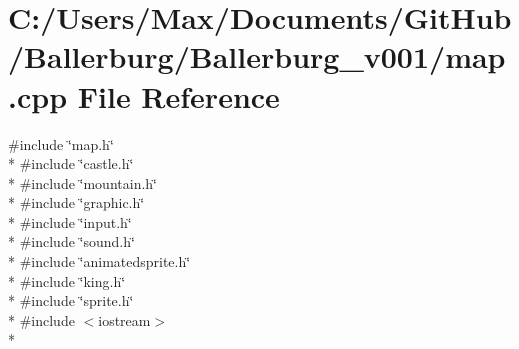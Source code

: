 \section{C\+:/\+Users/\+Max/\+Documents/\+Git\+Hub/\+Ballerburg/\+Ballerburg\+\_\+v001/map.cpp File Reference}
\label{map_8cpp}
{\ttfamily \#include \char`\"{}map.\+h\char`\"{}}\\*
{\ttfamily \#include \char`\"{}castle.\+h\char`\"{}}\\*
{\ttfamily \#include \char`\"{}mountain.\+h\char`\"{}}\\*
{\ttfamily \#include \char`\"{}graphic.\+h\char`\"{}}\\*
{\ttfamily \#include \char`\"{}input.\+h\char`\"{}}\\*
{\ttfamily \#include \char`\"{}sound.\+h\char`\"{}}\\*
{\ttfamily \#include \char`\"{}animatedsprite.\+h\char`\"{}}\\*
{\ttfamily \#include \char`\"{}king.\+h\char`\"{}}\\*
{\ttfamily \#include \char`\"{}sprite.\+h\char`\"{}}\\*
{\ttfamily \#include $<$iostream$>$}\\*
